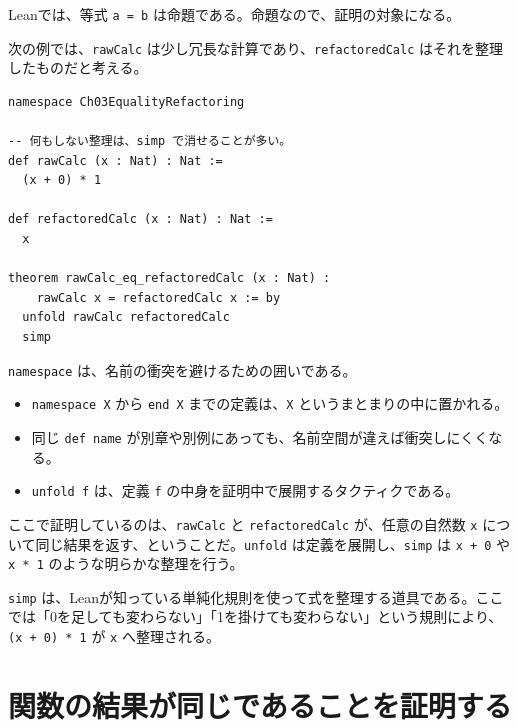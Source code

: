 Leanでは、等式 \texttt{a = b} は命題である。命題なので、証明の対象になる。

次の例では、\texttt{rawCalc} は少し冗長な計算であり、\texttt{refactoredCalc} はそれを整理したものだと考える。

\begin{listing}[htbp]
\begin{verbatim}
namespace Ch03EqualityRefactoring

-- 何もしない整理は、simp で消せることが多い。
def rawCalc (x : Nat) : Nat :=
  (x + 0) * 1

def refactoredCalc (x : Nat) : Nat :=
  x

theorem rawCalc_eq_refactoredCalc (x : Nat) :
    rawCalc x = refactoredCalc x := by
  unfold rawCalc refactoredCalc
  simp
\end{verbatim}
\caption{冗長な計算と整理後の計算}
\label{lst:ch03_raw_refactored}
\end{listing}

\begin{syntaxbox}
\texttt{namespace} は、名前の衝突を避けるための囲いである。
\begin{itemize}
\item \texttt{namespace X} から \texttt{end X} までの定義は、\texttt{X} というまとまりの中に置かれる。
\item 同じ \texttt{def name} が別章や別例にあっても、名前空間が違えば衝突しにくくなる。
\item \texttt{unfold f} は、定義 \texttt{f} の中身を証明中で展開するタクティクである。
\end{itemize}
\end{syntaxbox}


ここで証明しているのは、\texttt{rawCalc} と \texttt{refactoredCalc} が、任意の自然数 \texttt{x} について同じ結果を返す、ということだ。\texttt{unfold} は定義を展開し、\texttt{simp} は \texttt{x + 0} や \texttt{x * 1} のような明らかな整理を行う。

\begin{leanbox}
\texttt{simp} は、Leanが知っている単純化規則を使って式を整理する道具である。ここでは「0を足しても変わらない」「1を掛けても変わらない」という規則により、\texttt{(x + 0) * 1} が \texttt{x} へ整理される。
\end{leanbox}

\section{関数の結果が同じであることを証明する}

